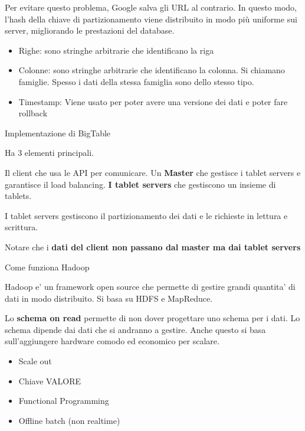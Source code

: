 Per evitare questo problema, Google salva gli URL al contrario. In questo modo,
l'hash della chiave di partizionamento viene distribuito in modo più uniforme
sui server, migliorando le prestazioni del database.

\begin{itemize}
    \item Righe: sono stringhe arbitrarie che identificano la riga
    \item Colonne: sono stringhe arbitrarie che identificano la colonna. Si chiamano
          famiglie. Spesso i dati della stessa famiglia sono dello stesso tipo.
    \item Timestamp: Viene usato per poter avere una versione dei dati e poter fare
          rollback
\end{itemize}

\begin{domanda}
    Implementazione di BigTable
\end{domanda}

Ha 3 elementi principali.

Il client che usa le API per comunicare. Un \textbf{Master} che gestisce i
tablet servers e garantisce il load balancing. \textbf{I tablet servers} che
gestiscono un insieme di tablets.

I tablet servers gestiscono il partizionamento dei dati e le richieste in
lettura e scrittura.

Notare che i\textbf{ dati del client non passano dal master ma dai tablet
    servers}

\begin{domanda}
    Come funziona Hadoop
\end{domanda}

Hadoop e' un framework open source che permette di gestire grandi quantita' di
dati in modo distribuito. Si basa su HDFS e MapReduce.

Lo \textbf{schema on read} permette di non dover progettare uno schema per i
dati. Lo schema dipende dai dati che si andranno a gestire. Anche questo si
basa sull'aggiungere hardware comodo ed economico per scalare.

\begin{itemize}
    \item Scale out
    \item Chiave VALORE
    \item Functional Programming
    \item Offline batch (non realtime)
\end{itemize}


